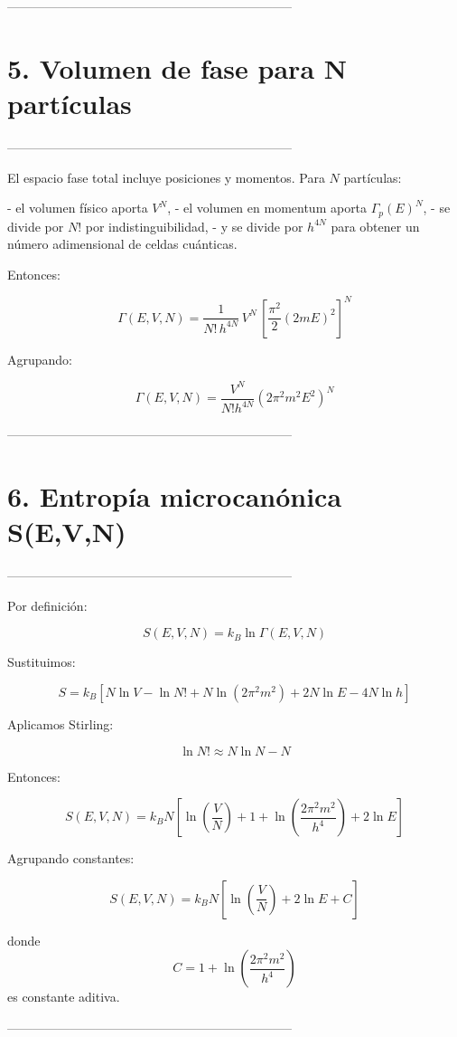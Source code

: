 \documentclass{article}
\begin{document}
--------------------------------------------------------------------
\section*{\textcolor{Apple Green}{5. Volumen de fase para N partículas}} 
--------------------------------------------------------------------

El espacio fase total incluye posiciones y momentos.  
Para \(N\) partículas:

- el volumen físico aporta \(V^{N}\),
- el volumen en momentum aporta \(\Gamma_{p}(E)^{N}\),
- se divide por \(N!\) por indistinguibilidad,
- y se divide por \(h^{4N}\) para obtener un número adimensional de celdas cuánticas.

Entonces:

\[
\Gamma(E,V,N)
= \frac{1}{N!\,h^{4N}} \,
V^{N}\,
\left[\frac{\pi^{2}}{2}(2mE)^{2}\right]^{N}
\]

Agrupando:

\[
\boxed{
\Gamma(E,V,N)
= \frac{V^{N}}{N!h^{4N}}
\left(
2\pi^{2}m^{2}E^{2}
\right)^{N}
}
\]

--------------------------------------------------------------------
\section*{\textcolor{Apple Green}{6. Entropía microcanónica S(E,V,N)}}
--------------------------------------------------------------------

Por definición:

\[
S(E,V,N)=k_{B}\ln \Gamma(E,V,N)
\]

Sustituimos:

\[
S
= k_{B}
\left[
N\ln V - \ln N!
+ N\ln(2\pi^{2}m^{2})
+ 2N\ln E
- 4N\ln h
\right]
\]

Aplicamos Stirling:

\[
\ln N! \approx N\ln N - N
\]

Entonces:

\[
S(E,V,N)
= k_{B}N\left[
\ln\left(\frac{V}{N}\right)
+ 1
+ \ln\left(\frac{2\pi^{2}m^{2}}{h^{4}}\right)
+ 2\ln E
\right]
\]

Agrupando constantes:

\[
\boxed{
S(E,V,N)
= k_{B}N
\left[
\ln\left(\frac{V}{N}\right)
+ 2\ln E
+ C
\right]
}
\]

donde  
\[
C = 1 + \ln\left(\frac{2\pi^{2}m^{2}}{h^{4}}\right)
\]
es constante aditiva.

--------------------------------------------------------------------
\end{document}
